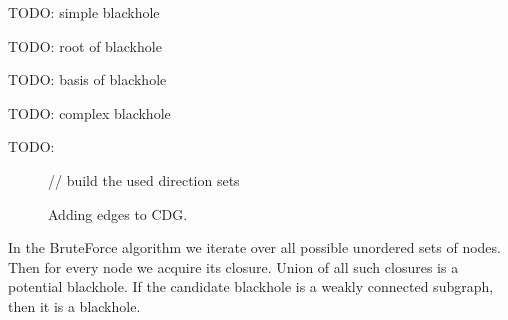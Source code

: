 \documentclass{svproc}
\begin{document}
\begin{definition}
TODO: simple blackhole
\end{definition}

\begin{definition}
TODO: root of blackhole
\end{definition}

\begin{definition}
TODO: basis of blackhole
\end{definition}

\begin{definition}
TODO: complex blackhole
\end{definition}

\begin{definition}
TODO:
\end{definition}

\begin{figure}[H]
	\begin{center}
		\begin{algorithm}[H]
			\SetAlgoLined
			// build the used direction sets\\ 
			\label{alg:add_additional_edge}
			\caption{Adding edges to CDG.}
		\end{algorithm}
	\end{center}
\end{figure}

In the BruteForce algorithm we iterate over all possible unordered sets of nodes. 
Then for every node we acquire its closure. Union of all such closures is a potential blackhole.
If the candidate blackhole is a weakly connected subgraph, then it is a blackhole.
\end{document}
